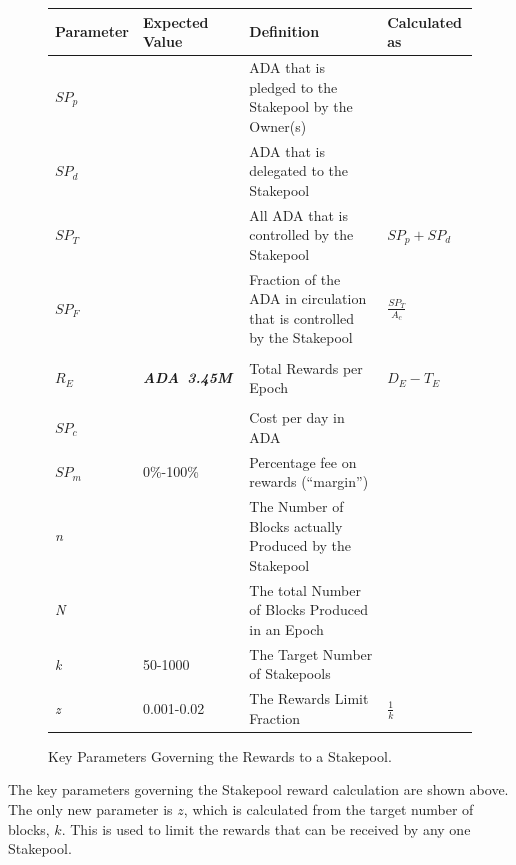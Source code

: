 \documentclass[11pt,a4paper,dvipsnames,twosided]{article}
\newcommand{\ada}{ADA{}}
\newcommand{\ADA}[1]{\textbf{\emph{\ada~{#1}}}}
\begin{document}
\begin{figure}[h!]
\begin{center}
\begin{tabular}{||l|l|p{6cm}|l||}
  \hline \hline
\textbf{Parameter} & \textbf{Expected Value} & \textbf{Definition} & \textbf{Calculated as} \\\hline
$SP_p$ & & \ada{} that is pledged to the Stakepool by the Owner(s) & \\\hline
$SP_d$ & & \ada{} that is delegated to the Stakepool & \\\hline
$SP_T$ & & All \ada{} that is controlled by the Stakepool & $SP_p + SP_d$ \\\hline
  $SP_F$ & & Fraction of the \ada{} in circulation that is controlled by the Stakepool & {\large $\frac{SP_T}{A_c}$} \\\hline
&&&  \\\hline
$R_E$ & \ADA{3.45M} & Total Rewards per Epoch & $D_E - T_E$ \\\hline
&&&  \\\hline
$SP_c$ &  & Cost per day in \ada{} & \\\hline
$SP_m$ &  0\%-100\% & Percentage fee on rewards (``margin'') & \\\hline
\emph{n} & & The Number of Blocks actually Produced by the Stakepool & \\\hline
\emph{N} & & The total Number of Blocks Produced in an Epoch & \\\hline
\emph{k} & 50-1000 & The Target Number of Stakepools & \\\hline
\emph{z} & 0.001-0.02 & The Rewards Limit Fraction & $\frac{1}{k}$ \\\hline
\hline
\end{tabular}
\end{center}
\caption{Key Parameters Governing the Rewards to a Stakepool.}
\label{fig:rewards}
\end{figure}

\noindent
The key parameters governing the Stakepool reward calculation are shown above.  The only new
parameter is $z$, which is calculated from the target number of blocks, $k$.  This is used
to limit the rewards that can be received by any one Stakepool.
\end{document}
